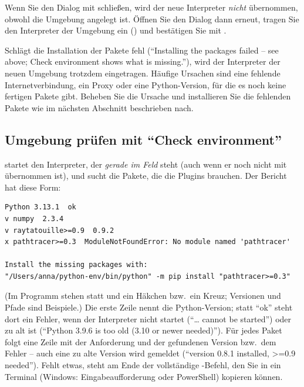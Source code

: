 \begin{warnung}
Wenn Sie den Dialog mit  schließen, wird der neue Interpreter \emph{nicht}
übernommen, obwohl die Umgebung angelegt ist. Öffnen Sie den Dialog dann erneut, tragen Sie
den Interpreter der Umgebung ein () und bestätigen Sie mit .
\end{warnung}

Schlägt die Installation der Pakete fehl (\enquote{Installing the packages failed -- see
above; Check environment shows what is missing.}), wird der Interpreter der neuen Umgebung
trotzdem eingetragen. Häufige Ursachen sind eine fehlende Internetverbindung, ein
Proxy oder eine Python-Version, für die es noch keine fertigen Pakete gibt. Beheben Sie die
Ursache und installieren Sie die fehlenden Pakete wie im nächsten Abschnitt beschrieben nach.

\subsection{Umgebung prüfen mit \enquote{Check environment}}
\label{sec:check-environment}

 startet den Interpreter, der \emph{gerade im Feld} steht (auch wenn
er noch nicht mit  übernommen ist), und sucht die Pakete, die die Plugins brauchen.
Der Bericht hat diese Form:

\begin{lstlisting}
Python 3.13.1  ok
v numpy  2.3.4
v raytatouille>=0.9  0.9.2
x pathtracer>=0.3  ModuleNotFoundError: No module named 'pathtracer'

Install the missing packages with:
"/Users/anna/python-env/bin/python" -m pip install "pathtracer>=0.3"
\end{lstlisting}

(Im Programm stehen statt  und  ein Häkchen bzw.\ ein Kreuz; Versionen und
Pfade sind Beispiele.) Die erste Zeile nennt die Python-Version; statt \enquote{ok} steht
dort ein Fehler, wenn der Interpreter nicht startet (\enquote{\dots{} cannot be started}) oder
zu alt ist (\enquote{Python 3.9.6 is too old (3.10 or newer needed)}). Für jedes Paket folgt
eine Zeile mit der Anforderung und der gefundenen Version bzw.\ dem Fehler -- auch eine zu
alte Version wird gemeldet (\enquote{version 0.8.1 installed, >=0.9 needed}). Fehlt etwas,
steht am Ende der vollständige -Befehl, den Sie in ein Terminal (Windows:
Eingabeaufforderung oder PowerShell) kopieren können.

